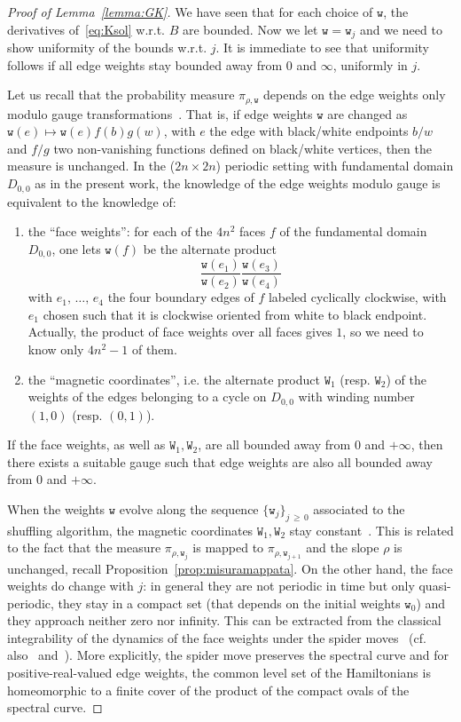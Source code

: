 \documentclass[10pt]{amsart}
\theoremstyle{definition}\newtheorem{defi}[theo]{Definition}\newtheorem{rema}[theo]{Remark}\newtheorem{exam}[theo]{Example}\newtheorem{exem}[theo]{Example}\newtheorem{nota}[theo]{Notation}
\newcommand{\ttw}{\mathtt{w}}
\newcommand{\ttW}{\mathtt{W}}
\begin{document}
\begin{proof}[{Proof of Lemma~\ref{lemma:GK}}]
We have seen that for each choice of $\ttw$, the derivatives of~\eqref{eq:Ksol} w.r.t. $B$ are bounded. Now we let $\ttw=\ttw_j$ and we need to show uniformity of the bounds w.r.t. $j$. It is immediate to see that uniformity follows if all edge weights stay bounded away from $0$ and $\infty$, uniformly in $j$.

Let us recall that the probability measure $\pi_{\rho,\ttw}$ depends on the edge weights only modulo gauge transformations~\cite[Section~3.2]{KenLectures}. That is, if edge weights $\ttw$ are changed as $\ttw(e)\mapsto \ttw(e) f(b)g(w)$, with $e$ the edge with black/white endpoints $b/w$ and $f/g$ two non-vanishing functions defined on black/white vertices, then the measure is unchanged. In the ($2n\times 2n$) periodic setting with fundamental domain $D_{0,0}$ as in the present work, the knowledge of the edge weights modulo gauge is equivalent to the knowledge of:
\begin{enumerate}
\item the ``face weights'': for each of the $4n^2$ faces $f$ of the fundamental domain $D_{0,0}$, one lets $\ttw(f)$ be the alternate product
\[
\frac{\ttw(e_1)}{\ttw(e_2)} \frac{\ttw(e_3)}{\ttw(e_4)}
\]
with $e_1,\,\dots,\,e_4$ the four boundary edges of $f$ labeled cyclically clockwise, with $e_1$ chosen such that it is clockwise oriented from white to black endpoint. Actually, the product of face weights over all faces gives $1$, so we need to know only $4n^2-1$ of them.
\item the ``magnetic coordinates'', i.e. the alternate product $\ttW_1$ (resp. $\ttW_2$) of the weights of the edges belonging to a cycle on $D_{0,0}$ with winding number $(1,0)$ (resp. $(0,1)$).
\end{enumerate}
If the face weights, as well as $\ttW_1,\ttW_2$, are all bounded away from $0$ and $+\infty$, then there exists a suitable gauge such that edge weights are also all bounded away from $0$ and $+\infty$.

When the weights $\ttw$ evolve along the sequence $\{\ttw_j\}_{j\,\ge\,0}$ associated to the shuffling algorithm, the magnetic coordinates $\ttW_1,\ttW_2$ stay constant~\cite{GK13}. This is related to the fact that the measure $\pi_{\rho,\ttw_j}$ is mapped to $\pi_{\rho,\ttw_{j+1}}$ and the slope $\rho$ is unchanged, recall Proposition~\ref{prop:misuramappata}. On the other hand, the face weights do change with $j$: in general they are not periodic in time but only quasi-periodic, they stay in a compact set (that depends on the initial weights $\ttw_0$) and they approach neither zero nor infinity. This can be extracted from the classical integrability of the dynamics of the face weights under the spider moves~\cite{GK13} (cf. also~\cite{fock2015inverse} and~\cite[Section~3]{Kenyon2003}). More explicitly, the spider move preserves the spectral curve and for positive-real-valued edge weights, the common level set of the Hamiltonians is homeomorphic to a finite cover of the product of the compact ovals of the spectral curve.
\end{proof}
\end{document}
